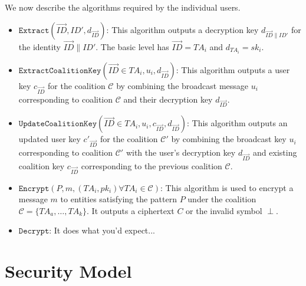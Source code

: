 \documentclass[10pt]{llncs}
\newcommand{\C}{\mathcal{C}}
\newcommand{\ID}{\mathit{ID}}
\newcommand{\TA}{\mathit{TA}}
\begin{document}
We now describe the algorithms required by the individual users.

\begin{itemize}
\item $\texttt{Extract}(\vec{ID},\ID',d_{\vec{\ID}})$: This algorithm outputs a decryption key $d_{\vec{\ID}\|\ID'}$ for the identity $\vec{\ID} \| \ID'$. The basic level has $\vec{\ID}=\TA_i$ and $d_{\TA_i}= sk_i$.
\medskip

\item $\texttt{ExtractCoalitionKey}(\vec{\ID} \in \TA_i, u_i, d_{\vec{\ID}})$: This algorithm outputs a user key $c_{\vec{\ID}}$ for the coalition $\C$ by combining the broadcast message $u_i$ corresponding to coalition $\C$ and their decryption key $d_{\vec{\ID}}$.
\medskip

\item $\texttt{UpdateCoalitionKey}(\vec{\ID} \in \TA_i, u_i , c_{\vec{\ID}}, d_{\vec{\ID}})$: This algorithm outputs an updated user key $c'_{\vec{\ID}}$ for the coalition $\C'$ by combining the broadcast key $u_i$ corresponding to coalition $\C'$ with the user's decryption key $d_{\vec{\ID}}$ and existing coalition key $c_{\vec{\ID}}$ corresponding to the previous coalition $\C$.
\medskip

\item $\texttt{Encrypt}(\mathit{P}, m, (\TA_i,pk_i) \forall \TA_i \in \C)$: This algorithm is used to encrypt a message $m$ to entities satisfying the pattern $\mathit{P}$ under the coalition $\C = \{\TA_a,\ldots,\TA_k\}$. It outputs a ciphertext $C$ or the invalid symbol $\perp$.
\medskip

\item $\texttt{Decrypt}$: It does what you'd expect...
\end{itemize}

\section{Security Model}
\end{document}
